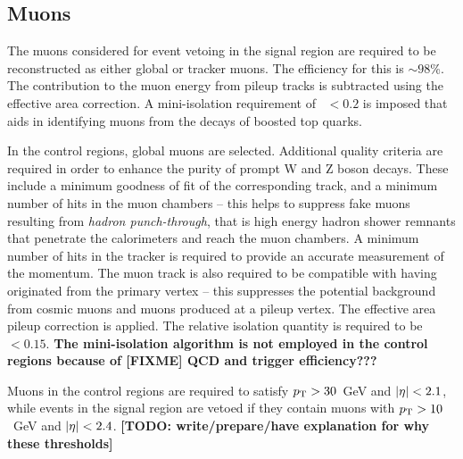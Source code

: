 \subsection*{Muons}

The muons considered for event vetoing in the signal region are required to be 
reconstructed as either global or tracker muons. The efficiency for this is 
$\sim98$\%. The contribution to the muon energy from pileup tracks is 
subtracted using the effective area correction. A mini-isolation requirement of 
\miniiso~$ < 0.2$ is imposed that aids in identifying muons from the decays of 
boosted top quarks.

In the control regions, global muons are selected. Additional quality criteria 
are required in order to enhance the purity of prompt W and Z boson decays. 
These include a minimum goodness of fit of the corresponding track, and a 
minimum number of hits in the muon chambers -- this helps to suppress fake 
muons resulting from \textit{hadron punch-through}, that is high energy hadron 
shower remnants that penetrate the calorimeters and reach the muon chambers. A 
minimum number of hits in the 
tracker is required to provide an accurate measurement of the momentum. The 
muon track is also required to be compatible with having originated from the 
primary vertex -- this suppresses the potential background from cosmic muons 
and muons produced at a pileup vertex. The effective area pileup correction is 
applied. The relative isolation quantity is required to be \reliso~$ < 0.15$. 
\textbf{The mini-isolation algorithm is not employed in the control regions 
because of 
[FIXME]
QCD and trigger efficiency???}



Muons in the control regions are required to satisfy ${p_{\text T}}>30$~GeV and 
$|\eta|<2.1$, while events in the signal region are vetoed if they contain 
muons with ${p_{\text T}}>10$~GeV and $|\eta|<2.4$. 
\textbf{[TODO: write/prepare/have explanation for why these thresholds]}

